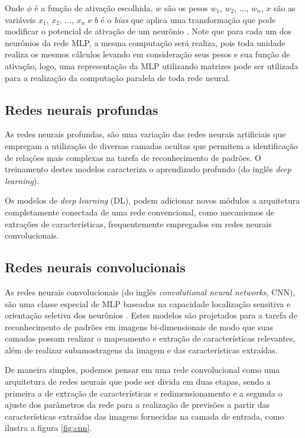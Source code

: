 Onde $\phi$ é a função de ativação escolhida, $w$ são os pesos $w_1$, $w_2$, ..., $w_n$, $x$ são as variáveis $x_1$, $x_2$, ..., $x_n$ e $b$ é o \textit{bias} que aplica uma transformação que pode modificar o potencial de ativação de um neurônio \cite{haykinNeuralNetworksLearning2009}. Note que para cada um dos neurônios da rede MLP, a mesma computação será realiza, pois toda unidade realiza os mesmos cálculos levando em consideração seus pesos e sua função de ativação, logo, uma representação da MLP utilizando matrizes pode ser utilizada para a realização da computação paralela de toda rede neural.

\subsection{Redes neurais profundas}

As redes neurais profundas, são uma variação das redes neurais artificiais que empregam a utilização de diversas camadas ocultas que permitem a identificação de relações mais complexas na tarefa de reconhecimento de padrões. O treinamento destes modelos caracteriza o aprendizado profundo (do inglês \textit{deep learning}).

Os modelos de \textit{deep learning} (DL), podem adicionar novos módulos a arquitetura completamente conectada de uma rede convencional, como mecanismos de extrações de características, frequentemente empregados em redes neurais convolucionais.

\subsection{Redes neurais convolucionais}

As redes neurais convolucionais (do inglês \textit{convolutional neural networks}, CNN), são uma classe especial de MLP baseadas na capacidade localização sensitiva e orientação seletiva dos neurônios \cite{haykinNeuralNetworksLearning2009}.
Estes modelos são projetados para a tarefa de reconhecimento de padrões em imagens bi-dimensionais de modo que suas camadas possam realizar o mapeamento e extração de características relevantes, além de realizar subamostragens da imagem e das características extraídas.

De maneira simples, podemos pensar em uma rede convolucional como uma arquitetura de redes neurais que pode ser divida em duas etapas, sendo a primeira a de extração de características e redimensionamento e a segunda o ajuste dos parâmetros da rede para a realização de previsões a partir das características extraídas das imagens fornecidas na camada de entrada, como ilustra a figura \ref{fig:cnn}.

